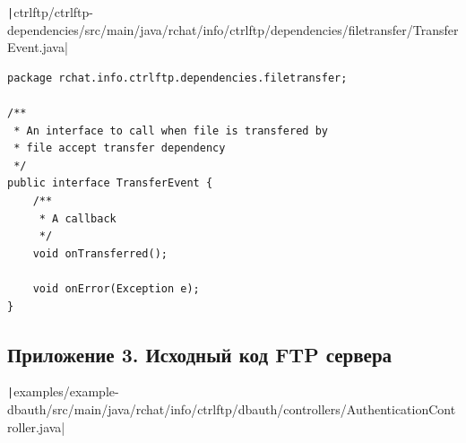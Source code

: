 \documentclass[a4paper,14pt]{extarticle}
\begin{document}
\texttt|ctrlftp/ctrlftp-dependencies/src/main/java/rchat/info/ctrlftp/dependencies/filetransfer/TransferEvent.java|
\begin{verbatim}
package rchat.info.ctrlftp.dependencies.filetransfer;

/**
 * An interface to call when file is transfered by
 * file accept transfer dependency
 */
public interface TransferEvent {
    /**
     * A callback
     */
    void onTransferred();

    void onError(Exception e);
}
\end{verbatim}
\subsection{Приложение 3. Исходный код FTP сервера}
\texttt|examples/example-dbauth/src/main/java/rchat/info/ctrlftp/dbauth/controllers/AuthenticationController.java|
\end{document}
